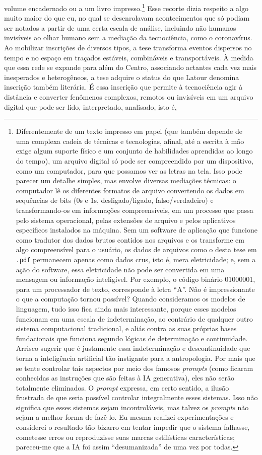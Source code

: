 volume encadernado ou a um livro impresso.\footnote{Diferentemente de um texto impresso em papel (que também depende de uma complexa cadeia de técnicas e tecnologias, afinal, até a escrita à mão exige algum suporte físico e um conjunto de habilidades aprendidas ao longo do tempo), um arquivo digital só pode ser compreendido por um dispositivo, como um computador, para que possamos ver as letras na tela. Isso pode parecer um detalhe simples, mas envolve diversas mediações técnicas: o computador lê os diferentes formatos de arquivo convertendo os dados em sequências de bits (0s e 1s, desligado/ligado, falso/verdadeiro) e transformando-os em informações compreensíveis, em um processo que passa pelo sistema operacional, pelas extensões de arquivo e pelos aplicativos específicos instalados na máquina. Sem um software de aplicação que funcione como tradutor dos dados brutos contidos nos arquivos e os transforme em algo compreensível para o usuário, os dados de arquivos como o desta tese em \texttt{.pdf} permanecem apenas como dados crus, isto é, mera eletricidade; e, sem a ação do software, essa eletricidade não pode ser convertida em uma mensagem ou informação inteligível. Por exemplo, o código binário 01000001, para um processador de texto, corresponde à letra \enquote{A}. Não é impressionante o que a computação tornou possível? Quando consideramos os modelos de linguagem, tudo isso fica ainda mais interessante, porque esses modelos funcionam em uma escala de indeterminação, ao contrário de qualquer outro sistema computacional tradicional, e aliás contra as suas próprias bases fundacionais que funciona segundo lógicas de determinação e continuidade. Arrisco sugerir que é justamente essa indeterminação e descontinuidade que torna a inteligência artificial tão instigante para a antropologia. Por mais que se tente controlar tais aspectos por meio dos famosos \textit{prompts} (como ficaram conhecidas as instruções que são feitas à IA generativa), eles não serão totalmente eliminados. O \textit{prompt} expressa, em certo sentido, a ilusão frustrada de que seria possível controlar integralmente esses sistemas. Isso não significa que esses sistemas sejam incontroláveis, mas talvez os \textit{prompts} não sejam a melhor forma de fazê-lo. Eu mesma realizei experimentações e considerei o resultado tão bizarro em tentar impedir que o sistema falhasse, cometesse erros ou reproduzisse suas marcas estilísticas características; pareceu-me que a IA foi assim \enquote{desumanizada} de uma vez por todas.} Esse recorte dizia respeito a algo muito maior do que eu, no qual se desenrolavam acontecimentos que só podiam ser notados a partir de uma certa escala de análise, incluindo não humanos invisíveis ao olhar humano sem a mediação da tecnociência, como o coronavírus. Ao mobilizar inscrições de diversos tipos, a tese transforma eventos dispersos no tempo e no espaço em traçados estáveis, combináveis e transportáveis. À medida que essa rede se expande para além do Centro, associando actantes cada vez mais inesperados e heterogêneos, a tese adquire o status do que Latour denomina inscrição também literária. É essa inscrição que permite à tecnociência agir à distância e converter fenômenos complexos, remotos ou invisíveis em um arquivo digital que pode ser lido, interpretado, analisado, isto é, 